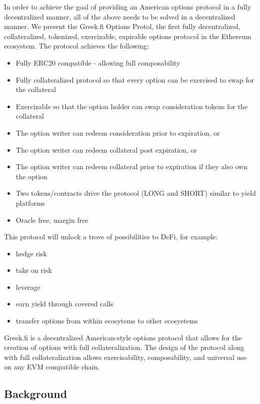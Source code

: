 \documentclass[%
 reprint,
 amsmath,amssymb,
 aps,
]{revtex4-2}
\newcommand{\greekfi}{Greek.fi }
\begin{document}
In order to achieve the goal of providing an American options protocol in a fully decentralized manner, all of the above needs to be solved in a decentralized manner.
We present the \greekfi Options Protol, the first fully decentralized, collateralized, tokenized, exercizable, expirable options protocol in the Ethereum ecosystem.
The protocol achieves the following:
\begin{itemize}
  \item Fully ERC20 compatible - allowing full composability
  \item Fully collateralized protocol so that every option can be exercised to swap for the collateral
  \item Exercizable so that the option holder can swap consideration tokens for the collateral
  \item The option writer can redeem consideration prior to expiration, or
  \item The option writer can redeem collateral post expiration, or
  \item The option writer can redeem collateral prior to expiration if they also own the option
  \item Two tokens/contracts drive the protocol (LONG and SHORT) similar to yield platforms
  \item Oracle free, margin free
\end{itemize}

This protocol will unlock a trove of possibilities to DeFi, for example:

\begin{itemize}
  \item hedge risk
  \item take on risk
  \item leverage
  \item earn yield through covered calls
  \item transfer options from within ecosytems to other ecosystems
\end{itemize}


\greekfi is a decentralized American-style options protocol that allows for the creation of options with full collateralization. 
The design of the protocol along with full collateralization allows exercisability, composability, and universal use on any EVM compatible chain.

\subsection{Background}
\end{document}
